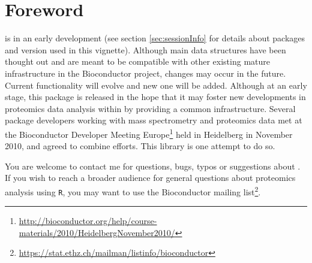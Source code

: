 \section*{Foreword}

 is in an early development %
(see section \ref{sec:sessionInfo} for details about packages and version used in this vignette). 
Although main data structures have been thought out and are meant to be compatible with other existing 
mature infrastructure in the Bioconductor project, changes may occur in the future. 
Current functionality will evolve and new one will be added. 
Although at an early stage, this package is released in the hope that it may foster  
new developments in proteomics data analysis within \R by providing a common infrastructure. 
Several package developers working with mass spectrometry and proteomics data met at the 
Bioconductor Developer Meeting Europe\footnote{\url{http://bioconductor.org/help/course-materials/2010/HeidelbergNovember2010/}} 
held in Heidelberg in November 2010, and agreed to combine efforts. 
This library is one attempt to do so.

\bigskip

You are welcome to contact me for questions, bugs, typos or suggestions about . 
If you wish to reach a broader audience for general questions about proteomics analysis using \texttt{R}, 
you may want to use the Bioconductor mailing 
list\footnote{\url{https://stat.ethz.ch/mailman/listinfo/bioconductor}}.
